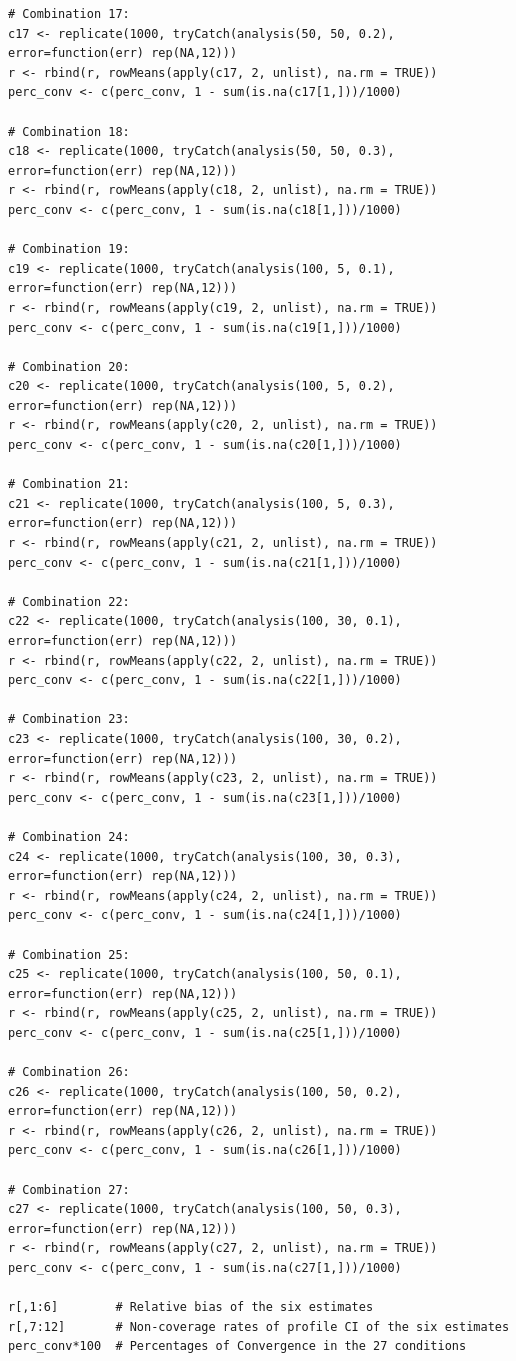 \documentclass[12pt,oneside,a4paper]{reedthesis}
\begin{document}
\begin{verbatim}
# Combination 17:
c17 <- replicate(1000, tryCatch(analysis(50, 50, 0.2), error=function(err) rep(NA,12)))
r <- rbind(r, rowMeans(apply(c17, 2, unlist), na.rm = TRUE))
perc_conv <- c(perc_conv, 1 - sum(is.na(c17[1,]))/1000)

# Combination 18:
c18 <- replicate(1000, tryCatch(analysis(50, 50, 0.3), error=function(err) rep(NA,12)))
r <- rbind(r, rowMeans(apply(c18, 2, unlist), na.rm = TRUE))
perc_conv <- c(perc_conv, 1 - sum(is.na(c18[1,]))/1000)

# Combination 19:
c19 <- replicate(1000, tryCatch(analysis(100, 5, 0.1), error=function(err) rep(NA,12)))
r <- rbind(r, rowMeans(apply(c19, 2, unlist), na.rm = TRUE))
perc_conv <- c(perc_conv, 1 - sum(is.na(c19[1,]))/1000)

# Combination 20:
c20 <- replicate(1000, tryCatch(analysis(100, 5, 0.2), error=function(err) rep(NA,12)))
r <- rbind(r, rowMeans(apply(c20, 2, unlist), na.rm = TRUE))
perc_conv <- c(perc_conv, 1 - sum(is.na(c20[1,]))/1000)

# Combination 21:
c21 <- replicate(1000, tryCatch(analysis(100, 5, 0.3), error=function(err) rep(NA,12)))
r <- rbind(r, rowMeans(apply(c21, 2, unlist), na.rm = TRUE))
perc_conv <- c(perc_conv, 1 - sum(is.na(c21[1,]))/1000)

# Combination 22:
c22 <- replicate(1000, tryCatch(analysis(100, 30, 0.1), error=function(err) rep(NA,12)))
r <- rbind(r, rowMeans(apply(c22, 2, unlist), na.rm = TRUE))
perc_conv <- c(perc_conv, 1 - sum(is.na(c22[1,]))/1000)

# Combination 23:
c23 <- replicate(1000, tryCatch(analysis(100, 30, 0.2), error=function(err) rep(NA,12)))
r <- rbind(r, rowMeans(apply(c23, 2, unlist), na.rm = TRUE))
perc_conv <- c(perc_conv, 1 - sum(is.na(c23[1,]))/1000)

# Combination 24:
c24 <- replicate(1000, tryCatch(analysis(100, 30, 0.3), error=function(err) rep(NA,12)))
r <- rbind(r, rowMeans(apply(c24, 2, unlist), na.rm = TRUE))
perc_conv <- c(perc_conv, 1 - sum(is.na(c24[1,]))/1000)

# Combination 25:
c25 <- replicate(1000, tryCatch(analysis(100, 50, 0.1), error=function(err) rep(NA,12)))
r <- rbind(r, rowMeans(apply(c25, 2, unlist), na.rm = TRUE))
perc_conv <- c(perc_conv, 1 - sum(is.na(c25[1,]))/1000)

# Combination 26:
c26 <- replicate(1000, tryCatch(analysis(100, 50, 0.2), error=function(err) rep(NA,12)))
r <- rbind(r, rowMeans(apply(c26, 2, unlist), na.rm = TRUE))
perc_conv <- c(perc_conv, 1 - sum(is.na(c26[1,]))/1000)

# Combination 27:
c27 <- replicate(1000, tryCatch(analysis(100, 50, 0.3), error=function(err) rep(NA,12)))
r <- rbind(r, rowMeans(apply(c27, 2, unlist), na.rm = TRUE))
perc_conv <- c(perc_conv, 1 - sum(is.na(c27[1,]))/1000)

r[,1:6]        # Relative bias of the six estimates
r[,7:12]       # Non-coverage rates of profile CI of the six estimates
perc_conv*100  # Percentages of Convergence in the 27 conditions

\end{verbatim}
\backmatter
\end{document}
